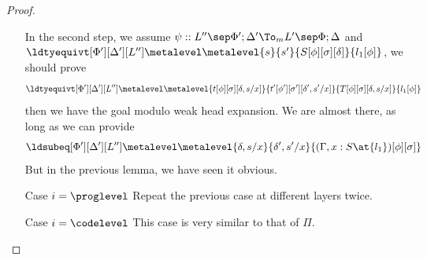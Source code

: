 \begin{proof}
\begin{itemize}
    In the second step, we assume
    $\psi :: L'' \sep \Phi'; \Delta' \To_m L' \sep \Phi; \Delta$ and 
    $\ldtyequivt[\Phi'][\Delta'][L''] \metalevel \metalevel{s}{s'}{S[\phi][\sigma][\delta]}{l_1[\phi]}$,
    we should prove
    \[
      \ldtyequivt[\Phi'][\Delta'][L''] \metalevel \metalevel{t[\phi][\sigma][\delta,
        s/x]}{t'[\phi'][\sigma'][\delta',s'/x]}{T[\phi][\sigma][\delta, s/x]}{l_1[\phi]}
    \]
    then we have the goal modulo weak head expansion. %
    We are almost there, as long as we can provide
    \[
      \ldsubeq[\Phi'][\Delta'][L''] \metalevel \metalevel {\delta,s/x}{\delta',s'/x}{(\Gamma, x : S \at{l_1})[\phi][\sigma]}
    \]
    But in the previous lemma, we have seen it obvious.
    
  \item[Case $i = \proglevel$] Repeat the previous case at different layers twice. %
  \item[Case $i = \codelevel$] This case is very similar to that of $\Pi$. %
  \end{itemize}  
\end{proof}

